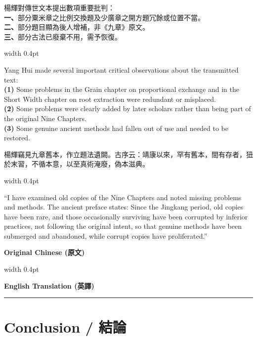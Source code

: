 \documentclass[10pt,a4paper]{article}
\newcommand{\zh}[1]{{\CJKfamily{notocjksc}#1}}
\newcommand{\bilingual}[2]{%
  \par\smallskip\noindent%
  \begin{minipage}[t]{0.47\textwidth}%
    \RaggedRight\small #1%
  \end{minipage}%
  \hfill\vrule width 0.4pt\hfill%
  \begin{minipage}[t]{0.47\textwidth}%
    \RaggedRight\small #2%
  \end{minipage}%
  \par\smallskip%
}
\newcommand{\colheaders}{%
  \noindent
  \begin{minipage}[t]{0.47\textwidth}%
    \centering\textbf{\small\color{sectioncolor}Original Chinese (原文)}%
  \end{minipage}%
  \hfill\vrule width 0.4pt\hfill
  \begin{minipage}[t]{0.47\textwidth}%
    \centering\textbf{\small\color{sectioncolor}English Translation (英譯)}%
  \end{minipage}%
  \par\vspace{0.5em}%
  \noindent\rule{\textwidth}{0.6pt}\par\vspace{0.5em}%
}
\begin{document}
\bilingual{
  楊輝對傳世文本提出數項重要批判：\\
  \textbf{一、}部分\zh{粟米}章之比例交換題及\zh{少廣}章之開方題冗餘或位置不當。\\
  \textbf{二、}部分題目顯為後人增補，非《九章》原文。\\
  \textbf{三、}部分古法已廢棄不用，需予恢復。
}{%
  Yang Hui made several important critical observations about the transmitted text:\\
  \textbf{(1)} Some problems in the Grain chapter on proportional exchange and in the Short Width chapter on root extraction were redundant or misplaced.\\
  \textbf{(2)} Some problems were clearly added by later scholars rather than being part of the original Nine Chapters.\\
  \textbf{(3)} Some genuine ancient methods had fallen out of use and needed to be restored.
}

\bilingual{
  \zh{楊輝竊見九章舊本，作立題法遺闕。古序云：靖康以來，罕有舊本，間有存者，狃於末習，不循本意，以至真術淹廢，偽本滋典。}
}{%
  ``I have examined old copies of the Nine Chapters and noted missing problems and methods. The ancient preface states: Since the Jingkang period, old copies have been rare, and those occasionally surviving have been corrupted by inferior practices, not following the original intent, so that genuine methods have been submerged and abandoned, while corrupt copies have proliferated.''
}

\newpage
\colheaders

\section{Conclusion / 結論}
\end{document}
